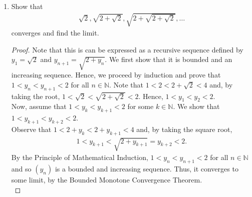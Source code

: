 \documentclass[12pt]{article}
\newcommand{\N}{\mathbb{N}}
\newenvironment{problem}[2][Problem]{\begin{trivlist} \item[\hskip \labelsep {\bfseries #1}\hskip \labelsep {\bfseries #2.}]}{\end{trivlist}}
\begin{document}
\begin{problem}{2.4.3}
\begin{enumerate}
  \item Show that 
\begin{align*}
  \sqrt{2}, \sqrt{2+\sqrt{2}}, \sqrt{2+\sqrt{2+\sqrt{2}}},\dots
\end{align*}
converges and find the limit.
\begin{proof}
  Note that this is can be expressed as a  recursive sequence defined by $y_{1} = \sqrt{2}$ and $y_{n+1} = \sqrt{2+y_{n}}$. We first show that it is bounded and an increasing sequence. Hence, we proceed by induction and prove that $1<y_{n} < y_{n+1}<2$ for all $n\in \N$. Note that $1<2<2+\sqrt{2}<4$ and, by taking the root, $1<\sqrt{2}<\sqrt{2+\sqrt{2}} < 2$. Hence, $1<y_{1}<y_{2}<2$.\\
  Now, assume that $1<y_{k}<y_{k+1}<2$ for some $k\in \N$. We show that $1<y_{k+1}<y_{k+2}<2$. \\
  Observe that $1<2+y_{k}<2+y_{k+1}<4$ and, by taking the square root, 
\begin{align*}
  1<y_{k+1} < \sqrt{2+y_{k+1}} = y_{k+2} < 2.
\end{align*}
By the Principle of Mathematical Induction, $1<y_{n}<y_{n+1}<2$ for all $n\in \N$ and so $(y_{n})$ is a bounded and increasing sequence. Thus, it converges to some limit, by the  Bounded Monotone Convergence Theorem.\\


\end{proof}
\end{enumerate}
\end{problem}
\end{document}
